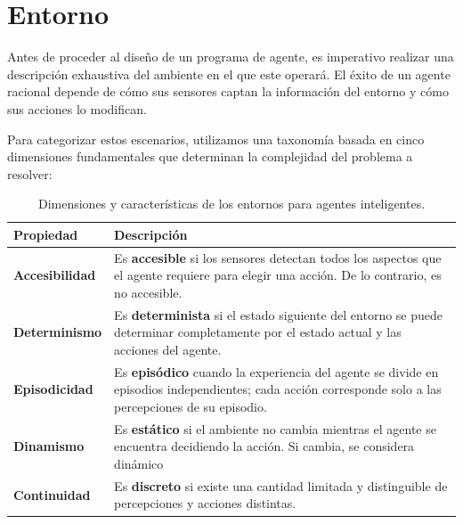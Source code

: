 \section{Entorno}
Antes de proceder al diseño de un programa de agente, es imperativo realizar una descripción exhaustiva del ambiente en el que este operará. El éxito de un agente racional depende de cómo sus sensores captan la información del entorno y cómo sus acciones lo modifican. 

\medskip
\noindent
Para categorizar estos escenarios, utilizamos una taxonomía basada en cinco dimensiones fundamentales que determinan la complejidad del problema a resolver:

\bigskip

\begin{table}[h]
\centering
\renewcommand{\arraystretch}{1.5}
\begin{tabularx}{\textwidth}{|l|X|} 
\hline
\textbf{Propiedad} & \textbf{Descripción} \\ \hline
\textbf{Accesibilidad} & Es \textbf{accesible} si los sensores detectan todos los aspectos que el agente requiere para elegir una acción. De lo contrario, es no accesible. \\ \hline
\textbf{Determinismo} & Es \textbf{determinista} si el estado siguiente del entorno se puede determinar completamente por el estado actual y las acciones del agente. \\ \hline
\textbf{Episodicidad} & Es \textbf{episódico} cuando la experiencia del agente se divide en episodios independientes; cada acción corresponde solo a las percepciones de su episodio. \\ \hline
\textbf{Dinamismo} & Es \textbf{estático} si el ambiente no cambia mientras el agente se encuentra decidiendo la acción. Si cambia, se considera dinámico \\ \hline
\textbf{Continuidad} & Es \textbf{discreto} si existe una cantidad limitada y distinguible de percepciones y acciones distintas. \\ \hline
\end{tabularx}
\caption{Dimensiones y características de los entornos para agentes inteligentes.}
\end{table}

